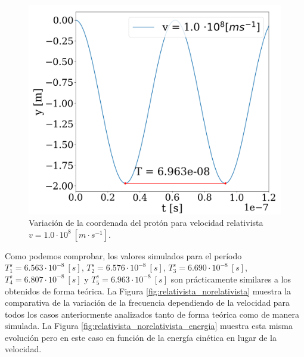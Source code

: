 \documentclass[journal]{IEEEtran}
\begin{document}
\bigskip
\bigskip
\bigskip
\bigskip
\bigskip
\bigskip

\hfill

\begin{figure}[!htb]
    \centering
    \includegraphics[width=\linewidth]{freq_rel_t_4.png}
    \caption{Variación de la coordenada del protón para velocidad relativista $v = 1.0\cdot 10^8~[m\cdot s^{-1}]$.}
    \label{fig:freqrelt4}
\end{figure}

\hfill

\clearpage

Como podemos comprobar, los valores simulados para el período $T^s_1 = 6.563\cdot 10^{-8}~[s]$, $T^s_2 = 6.576\cdot 10^{-8}~[s]$, $T^s_3 = 6.690\cdot 10^{-8}~[s]$, $T^s_4 = 6.807\cdot 10^{-8}~[s]$ y $T^s_5 = 6.963\cdot 10^{-8}~[s]$ son prácticamente similares a los obtenidos de forma teórica. La Figura \ref{fig:relativista_norelativista} muestra la comparativa de la variación de la frecuencia dependiendo de la velocidad para todos los casos anteriormente analizados tanto de forma teórica como de manera simulada. La Figura \ref{fig:relativista_norelativista_energia} muestra esta misma evolución pero en este caso en función de la energía cinética en lugar de la velocidad.
\end{document}
